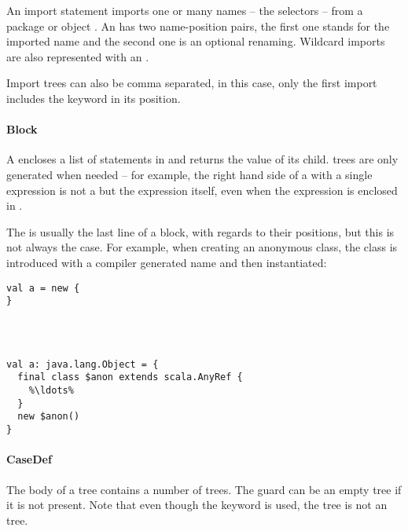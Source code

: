 \noindent An import statement imports one or many names -- the selectors -- from a package or object . An  has two name-position pairs, the first one stands for the imported name and the second one is an optional renaming. Wildcard imports are also represented with an .

Import trees can also be comma separated, in this case, only the first import includes the  keyword in its position.

\paragraph{Block} 

\noindent A  encloses a list of statements in \src{\{ \ldots \}} and returns the value of its  child.  trees are only generated when needed -- for example, the right hand side of a  with a single expression is not a  but the expression itself, even when the expression is enclosed in \src{\{ \ldots \}}.

The  is usually the last line of a block, with regards to their positions, but this is not always the case. For example, when creating an anonymous class, the class is introduced with a compiler generated name and then instantiated:

\begin{multicols}{2}
\begin{lstlisting}
val a = new {
}




\end{lstlisting}
\begin{lstlisting}
val a: java.lang.Object = {
  final class $anon extends scala.AnyRef {
    %\ldots%
  }
  new $anon()
}
\end{lstlisting}
\end{multicols}

\paragraph{CaseDef} 

\noindent The body of a  tree contains a number of  trees. The guard can be an empty tree if it is not present. Note that even though the  keyword is used, the tree is not an  tree.

